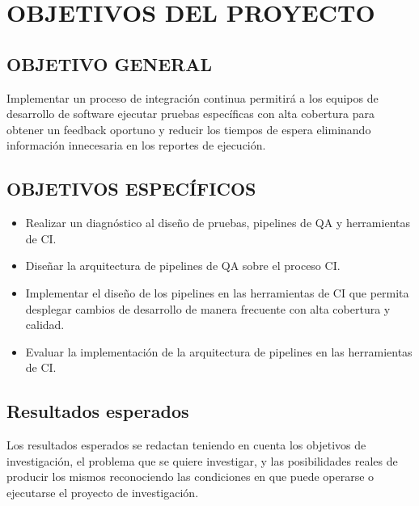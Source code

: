 \section{OBJETIVOS DEL PROYECTO }

\subsection{OBJETIVO GENERAL}
Implementar un proceso de integración continua permitirá a los equipos de desarrollo de software ejecutar pruebas específicas con alta cobertura para obtener un feedback oportuno y reducir los tiempos de espera eliminando información innecesaria en los reportes de ejecución.

\subsection{OBJETIVOS ESPECÍFICOS}
\begin{itemize}
\item Realizar un diagnóstico al diseño de pruebas, pipelines de QA y herramientas de CI.
\item Diseñar la arquitectura de pipelines de QA sobre el proceso CI.
\item Implementar el diseño de los pipelines en las herramientas de CI que permita desplegar cambios de desarrollo de manera frecuente con alta cobertura y calidad.
\item Evaluar la implementación de la arquitectura de pipelines en las herramientas de CI.
\end{itemize}
\subsection{Resultados esperados}
Los resultados esperados se redactan teniendo en cuenta los objetivos de investigación, el problema que se quiere investigar, y las posibilidades reales de producir los mismos reconociendo las condiciones en que puede operarse o ejecutarse el proyecto de investigación.